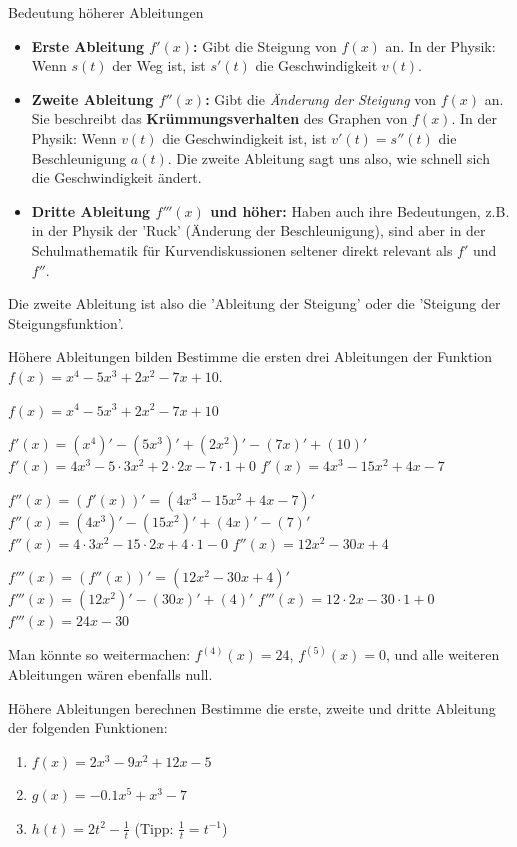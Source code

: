 \begin{warumwichtigumgebung}{Bedeutung höherer Ableitungen}
\begin{itemize}
    \item \textbf{Erste Ableitung $f'(x)$:} Gibt die Steigung von $f(x)$ an. In der Physik: Wenn $s(t)$ der Weg ist, ist $s'(t)$ die Geschwindigkeit $v(t)$.
    \item \textbf{Zweite Ableitung $f''(x)$:} Gibt die \textit{Änderung der Steigung} von $f(x)$ an. Sie beschreibt das \textbf{Krümmungsverhalten} des Graphen von $f(x)$. In der Physik: Wenn $v(t)$ die Geschwindigkeit ist, ist $v'(t) = s''(t)$ die Beschleunigung $a(t)$. Die zweite Ableitung sagt uns also, wie schnell sich die Geschwindigkeit ändert.
    \item \textbf{Dritte Ableitung $f'''(x)$ und höher:} Haben auch ihre Bedeutungen, z.B. in der Physik der 'Ruck' (Änderung der Beschleunigung), sind aber in der Schulmathematik für Kurvendiskussionen seltener direkt relevant als $f'$ und $f''$.
\end{itemize}
Die zweite Ableitung ist also die 'Ableitung der Steigung' oder die 'Steigung der Steigungsfunktion'.
\end{warumwichtigumgebung}

\begin{beispielumgebung}{Höhere Ableitungen bilden}
Bestimme die ersten drei Ableitungen der Funktion $f(x) = x^4 - 5x^3 + 2x^2 - 7x + 10$.

$f(x) = x^4 - 5x^3 + 2x^2 - 7x + 10$

$f'(x) = (x^4)' - (5x^3)' + (2x^2)' - (7x)' + (10)'$
$f'(x) = 4x^3 - 5 \cdot 3x^2 + 2 \cdot 2x - 7 \cdot 1 + 0$
$f'(x) = 4x^3 - 15x^2 + 4x - 7$

$f''(x) = (f'(x))' = (4x^3 - 15x^2 + 4x - 7)'$
$f''(x) = (4x^3)' - (15x^2)' + (4x)' - (7)'$
$f''(x) = 4 \cdot 3x^2 - 15 \cdot 2x + 4 \cdot 1 - 0$
$f''(x) = 12x^2 - 30x + 4$

$f'''(x) = (f''(x))' = (12x^2 - 30x + 4)'$
$f'''(x) = (12x^2)' - (30x)' + (4)'$
$f'''(x) = 12 \cdot 2x - 30 \cdot 1 + 0$
$f'''(x) = 24x - 30$

Man könnte so weitermachen: $f^{(4)}(x) = 24$, $f^{(5)}(x) = 0$, und alle weiteren Ableitungen wären ebenfalls null.
\end{beispielumgebung}

\begin{aufgabenumgebung}{Höhere Ableitungen berechnen}
Bestimme die erste, zweite und dritte Ableitung der folgenden Funktionen:
\begin{enumerate}
    \item $f(x) = 2x^3 - 9x^2 + 12x - 5$
    \item $g(x) = -0.1x^5 + x^3 - 7$
    \item $h(t) = 2t^2 - \frac{1}{t}$ (Tipp: $\frac{1}{t} = t^{-1}$)
\end{enumerate}
\end{aufgabenumgebung}

